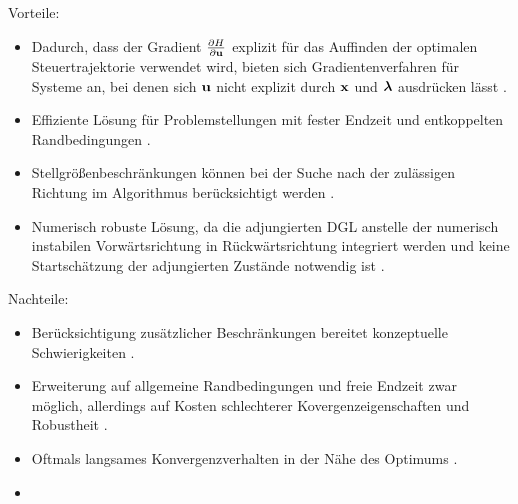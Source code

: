 \begin{multicols}{2}
	Vorteile:
	\begin{itemize}
		\item Dadurch, dass der Gradient $\frac{\partial H}{\partial \boldsymbol{\mathrm{u}}}$ explizit für das Auffinden der optimalen Steuertrajektorie verwendet wird, bieten sich Gradientenverfahren für Systeme an, bei denen sich $\boldsymbol{\mathrm{u}}$ nicht explizit durch $\boldsymbol{\mathrm{x}}$ und $\boldsymbol{\mathrm{\lambda}}$ ausdrücken lässt \cite{KnutGraichen.2012}.
		\item Effiziente Lösung für Problemstellungen mit fester Endzeit und entkoppelten Randbedingungen \cite{Papageorgiou.2012}.
		\item Stellgrößenbeschränkungen können bei der Suche nach der zulässigen Richtung im Algorithmus berücksichtigt werden \cite{Papageorgiou.2012}.
		\item Numerisch robuste Lösung, da die adjungierten \gls{DGL} anstelle der numerisch instabilen Vorwärtsrichtung in Rückwärtsrichtung integriert werden und keine Startschätzung der adjungierten Zustände notwendig ist \cite{KnutGraichen.2012}.
	\end{itemize}
	
	\columnbreak
	
	Nachteile:
	\begin{itemize}
				\item Berücksichtigung zusätzlicher Beschränkungen bereitet konzeptuelle Schwierigkeiten \cite{Papageorgiou.2012}.\vspace{\fill}
				\item Erweiterung auf allgemeine Randbedingungen und freie Endzeit zwar möglich, allerdings auf Kosten schlechterer Kovergenzeigenschaften und Robustheit \cite{KnutGraichen.2012}.\vspace{\fill}
				\item Oftmals langsames Konvergenzverhalten in der Nähe des Optimums \cite{KnutGraichen.2012}.\vspace{\fill}
			    \item[\vspace{\fill}]
	\end{itemize}
\end{multicols}

